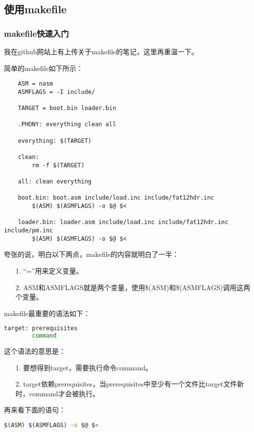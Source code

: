 \documentclass[a4paper,left=2.5cm,right=2.5cm,11pt]{article}
\begin{document}
\subsection{使用makefile}
\subsubsection{makefile快速入门}
	我在github网站上有上传关于makefile的笔记，这里再重温一下。\par

	简单的makefile如下所示：
	\begin{lstlisting}
	ASM = nasm
	ASMFLAGS = -I include/

	TARGET = boot.bin loader.bin

	.PHONY: everything clean all

	everything: $(TARGET)

	clean:
		rm -f $(TARGET)

	all: clean everything

	boot.bin: boot.asm include/load.inc include/fat12hdr.inc
		$(ASM) $(ASMFLAGS) -o $@ $<

	loader.bin: loader.asm include/load.inc include/fat12hdr.inc include/pm.inc
		$(ASM) $(ASMFLAGS) -o $@ $<
	\end{lstlisting}

	夸张的说，明白以下两点，makefile的内容就明白了一半：
	\begin{itemize}
		\item[1.] “=”用来定义变量。
		\item[2.] ASM和ASMFLAGS就是两个变量，使用\$(ASM)和\$(ASMFLAGS)调用这两个变量。
	\end{itemize}

	makefile最重要的语法如下：
	\begin{lstlisting}[language = bash]
	target: prerequisites
		command
	\end{lstlisting}

	这个语法的意思是：
	\begin{itemize}
		\item[1.] 要想得到target，需要执行命令command。
		\item[2.] target依赖prerequisites，当prerequisites中至少有一个文件比target文件新时，command才会被执行。
	\end{itemize}

	再来看下面的语句：
	\begin{lstlisting}[language = bash]
	$(ASM) $(ASMFLAGS) -o $@ $<
	\end{lstlisting}
\end{document}
